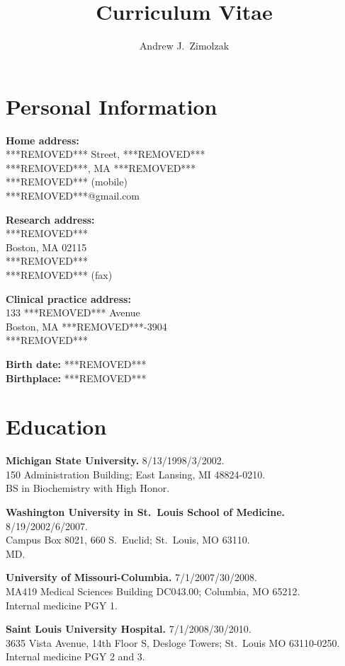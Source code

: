 \documentclass[12pt]{article}
\title{Curriculum Vitae}
\author{Andrew J.\ Zimolzak}
\begin{document}
\thispagestyle{fancy}

\section*{Personal Information}

\textbf{Home address:}\\
***REMOVED*** Street, ***REMOVED***\\
***REMOVED***, MA ***REMOVED***\\
***REMOVED*** (mobile)\\
***REMOVED***@gmail.com

\textbf{Research address:}\\
***REMOVED***\\
Boston, MA 02115\\
***REMOVED***\\
***REMOVED*** (fax)

\textbf{Clinical practice address:}\\
133 ***REMOVED*** Avenue\\
Boston, MA ***REMOVED***-3904\\
***REMOVED***

\textbf{Birth date:} ***REMOVED***\\
\textbf{Birthplace:} ***REMOVED***

\section*{Education}

\textbf{Michigan State University.} 8/13/1998/3/2002.\\
150 Administration Building; East Lansing, MI 48824-0210.\\
BS in Biochemistry with High Honor.

\textbf{Washington University in St.\ Louis School of Medicine.}
8/19/2002/6/2007.\\
Campus Box 8021, 660 S.\ Euclid; St.\ Louis, MO 63110.\\
MD.

\textbf{University of Missouri-Columbia.} 7/1/2007/30/2008.\\
MA419 Medical Sciences Building DC043.00; Columbia, MO 65212.\\
Internal medicine PGY 1.

\textbf{Saint Louis University Hospital.} 7/1/2008/30/2010.\\
3635 Vista Avenue, 14th Floor S, Desloge Towers; St.\ Louis MO
63110-0250.\\
Internal medicine PGY 2 and 3.
\end{document}
